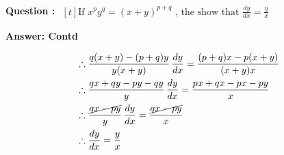 \documentclass{beamer}
\begin{document}
\frame
{ \textbf{Question :} 
$\begin{aligned}[t] 
\text{If \ } x^p y^q = (x+y)^{p+q} \text{\ , \ the show that \ \  } \frac{dy}{dx}=\frac{y}{x}
\end{aligned}$

\textbf{Answer: Contd}

\begin{equation} \nonumber
\begin{alignedat}{4}
& \therefore \frac{q(x+y) - (p+q)y}{y(x+y)} \,  \frac{dy}{dx} = \frac{(p+q)x - p(x+y)}{(x+y)x}\\
& \therefore \frac{qx + qy - py - qy}{y} \,  \frac{dy}{dx} = \frac{px + qx - px - py}{x}\\
& \therefore \frac{\cancel{qx - py}}{y} \,  \frac{dy}{dx} =  \frac{\cancel{qx - py}}{x}\\
& \therefore \frac{dy}{dx}=\frac{y}{x}\\
& \\
& \\
& \\
& \\
& \\
& \\
\end{alignedat}
\end{equation}

}

\end{document}
